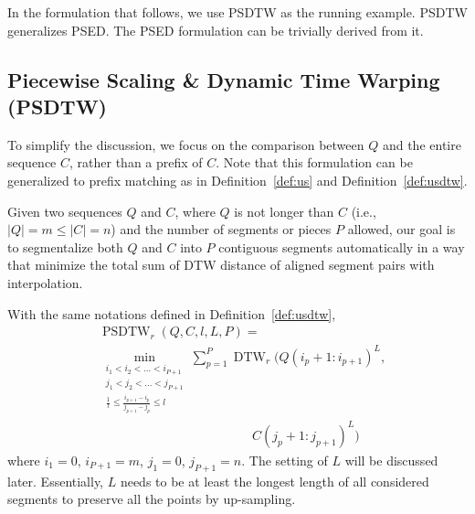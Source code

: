 In the formulation that follows, we use PSDTW as the running example. 
PSDTW generalizes PSED.
The PSED formulation can be trivially derived from it.

\subsection{Piecewise Scaling \& Dynamic Time Warping (PSDTW)} %

\noindent{} 
To simplify the discussion, we focus on the comparison between $Q$ and the entire sequence $C$, rather than a prefix of $C$. 
Note that this formulation can be generalized to prefix matching as in Definition~\ref{def:us} and Definition~\ref{def:usdtw}.

Given two sequences $Q$ and $C$, where $Q$ is not longer than $C$ (i.e., $|Q| = m \leq |C| = n$) and the number of segments or pieces $P$ allowed, our goal is to segmentalize both $Q$ and $C$ into $P$ contiguous segments automatically in a way that minimize the total sum of DTW distance of aligned segment pairs with interpolation. 

\begin{definition}
    \label{def:psdtw}
    With the same notations defined in Definition~\ref{def:usdtw},
    \begin{equation}
        \label{eq:psdtw}
        \begin{split}
            & \operatorname{PSDTW}_r(Q, C, l, L, P) = \\
            & \min_{\substack{
            i_1 < i_2 < \dots < i_{P+1} \\ 
            j_1 < j_2 < \dots < j_{P+1} \\
            \frac{1}{l} \leq \frac{i_{p+1} - i_p}{j_{p+1} - j_p} \leq l
            }} \sum_{p=1}^{P} \operatorname{DTW}_r(Q{(i_p+1:i_{p+1})}^L, \\
            & \qquad \qquad \qquad \qquad \qquad \qquad C{(j_p+1:j_{p+1})}^L)
        \end{split}
    \end{equation}
    where $i_1 = 0$, $i_{P+1} = m$, $j_1 = 0$, $j_{P+1} = n$.
    The setting of $L$ will be discussed later. Essentially, $L$ needs to be at least the longest length of all considered segments to preserve all the points by up-sampling.
\end{definition}


